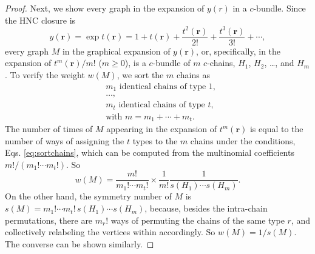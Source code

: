 \documentclass[preprint]{revtex4-1}
\newcommand{\vct}[1]{\mathbf{#1}}
\providecommand{\vr}{} %
\renewcommand{\vr}{\vct{r}}
\begin{document}
\begin{proof}
Next, we show every graph in the expansion of $y(r)$
  in a $c$-bundle.
%
Since the HNC closure is
\[
  y(\vr)
= \exp t(\vr)
=
1 + t(\vr)
+ \frac{ t^2(\vr) }{ 2! }
+ \frac{ t^3(\vr) }{ 3! }+ \cdots,
\]
every graph $M$ in the graphical expansion of $y(\vr)$,
  or, specifically, in the expansion of $t^m(\vr)/m!$ ($m \ge 0$),
  is a $c$-bundle of $m$ $c$-chains,
  $H_1$, $H_2$, \dots, and $H_m$.
%
%
To verify the weight $w(M)$,
  we sort the $m$ chains as
\begin{equation}
\begin{split}
& \text{$m_1$ identical chains of type $1$}, \\
& \dots, \\
& \text{$m_t$ identical chains of type $t$}, \\
& \text{with $m = m_1 + \cdots + m_t$}.
\end{split}\label{eq:sortchains}
\end{equation}
%
The number of times of $M$
  appearing in the expansion of $t^m(\vr)$
  is equal to the number of ways
  of assigning the $t$ types to the $m$ chains
  under the conditions, Eqs. \eqref{eq:sortchains},
  which can be computed from the multinomial coefficients
  $m!/(m_1! \cdots m_t!)$.
%
So
%
\[
  w(M)
=
  \frac{ m! } { m_1! \cdots m_t! }
  \times
  \frac{ 1 } { m! }
  \frac{ 1 } { s(H_1) \cdots s(H_m) }.
\]
%
On the other hand,
  the symmetry number of $M$ is
  $s(M) = m_1! \cdots m_t! \, s(H_1) \cdots s(H_m)$,
  because, besides the intra-chain permutations,
  there are $m_r!$ ways of permuting the chains of the same type $r$,
  and collectively relabeling the vertices within accordingly.
So $w(M) = 1/s(M)$.
%
The converse can be shown similarly.


\end{proof}
\end{document}
